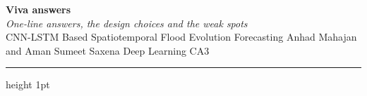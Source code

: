 \documentclass[9pt,a4paper]{extarticle}
\begin{document}
\begin{center}
{\fontsize{20}{24}\selectfont\bfseries\color{maroon} Viva answers}\\[2pt]
{\normalsize\itshape One-line answers, the design choices and the weak spots}\\[2pt]
{\footnotesize CNN-LSTM Based Spatiotemporal Flood Evolution Forecasting \textperiodcentered{} Anhad Mahajan and Aman Sumeet Saxena \textperiodcentered{} Deep Learning CA3}
\end{center}
{\color{maroon}\hrule height 1pt}\vspace{3pt}
\setcounter{section}{0}



\end{document}
